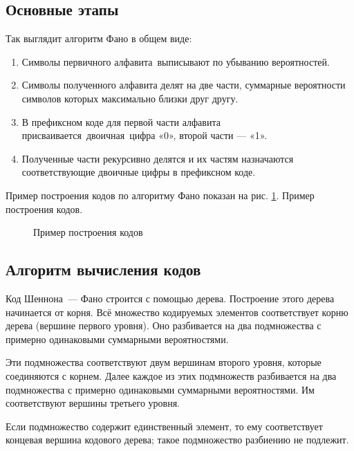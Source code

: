 \documentclass{article}
\begin{document}
\subsection{Основные этапы}
Так выглядит алгоритм Фано в общем виде:
\begin{enumerate}
 \item Символы первичного алфавита выписывают по убыванию вероятностей.
 \item Символы полученного алфавита делят на две части, суммарные вероятности 
 символов которых максимально близки друг другу.
 \item В префиксном коде для первой части алфавита присваивается двоичная цифра «0», 
 второй части --- «1».
 \item Полученные части рекурсивно делятся и их частям назначаются соответствующие 
 двоичные цифры в префиксном коде.\\
\end{enumerate}
Пример построения кодов по алгоритму Фано показан на рис. \ref{codesex}. Пример построения кодов.

\begin{figure}[H]
  \caption{Пример построения кодов\label{codesex}}
\end{figure}


\newpage
\subsection{Алгоритм вычисления кодов}

Код Шеннона — Фано строится с помощью дерева. Построение этого дерева начинается от корня. 
Всё множество кодируемых элементов соответствует корню дерева (вершине первого уровня). 
Оно разбивается на два подмножества с примерно одинаковыми суммарными вероятностями. 

Эти подмножества соответствуют двум вершинам второго уровня, которые соединяются с корнем. 
Далее каждое из этих подмножеств разбивается на два подмножества с примерно одинаковыми 
суммарными вероятностями. Им соответствуют вершины третьего уровня. 

Если подмножество содержит 
единственный элемент, то ему соответствует концевая вершина кодового дерева; такое подмножество 
разбиению не подлежит.
\end{document}
